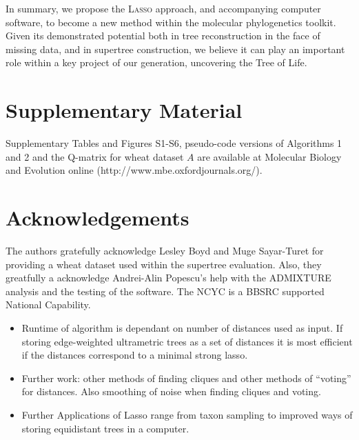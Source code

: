 In summary, we propose the \textsc{Lasso} approach, and accompanying computer
software, to become a new method within the molecular phylogenetics
toolkit. Given its demonstrated potential both in tree reconstruction in the
face of missing data, and in supertree construction, we believe it can play an
important role within a key project of our generation, uncovering the Tree of
Life.

\section{Supplementary Material}

Supplementary Tables and Figures S1-S6, pseudo-code versions
of Algorithms 1 and 2 and the Q-matrix for wheat dataset $A$  are available  
at Molecular Biology and Evolution
online (http://www.mbe.oxfordjournals.org/).

\section{Acknowledgements}
\label{sec:acknowledgements}

The authors gratefully acknowledge Lesley Boyd and Muge Sayar-Turet for
providing a wheat dataset used within the supertree evaluation. Also, they
greatfully a acknowledge Andrei-Alin Popescu's help with the ADMIXTURE
analysis and the testing of the software. The NCYC is a BBSRC supported
National Capability.

\begin{itemize}
\item Runtime of algorithm is dependant on number of distances used as input.
  If storing edge-weighted ultrametric trees as a set of distances it is most
  efficient if the distances correspond to a minimal strong lasso.
\item Further work: other methods of finding cliques and other methods of
  ``voting'' for distances.  Also smoothing of noise when finding cliques and
  voting. 
\item Further Applications of {\sc Lasso} range from
taxon sampling to improved ways of storing equidistant trees in a computer.

\end{itemize}


